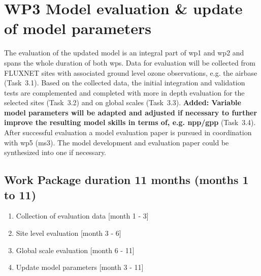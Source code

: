 \section{WP3 Model evaluation \& update of model parameters}
\label{sec:wp3}
The evaluation of the updated model is an integral part of \gls{wp}1 and \gls{wp}2 and spans the whole duration of both \glspl{wp}. Data for evaluation will be collected from FLUXNET sites with associated ground level ozone observations, e.g. the \gls{airbase} (Task~3.1). Based on the collected data, the initial integration and validation tests are complemented and completed with more in depth evaluation for the selected sites (Task~3.2) and on global scales (Task~3.3). \textbf{\color{blue}Added: Variable model parameters will be adapted and adjusted if necessary to further improve the resulting model skills in terms of, e.g. \gls{npp}/\gls{gpp}} (Task~3.4). After successful evaluation a model evaluation paper is pursued in coordination with \gls{wp}5 (\gls{ms}3). The model development and evaluation paper could be synthesized into one if necessary.
{
\subsection*{Work Package duration 11 months (months 1 to 11)}
\begin{enumerate}[start=1,label={T3.\arabic*}]
  \itemsep0pt
\item Collection of evaluation data \hfill [month 1 - 3]
\item Site level evaluation \hfill [month 3 - 6]
\item Global scale evaluation \hfill [month 6 - 11]
\item Update model parameters \hfill [month 3 - 11]
\end{enumerate}
}


